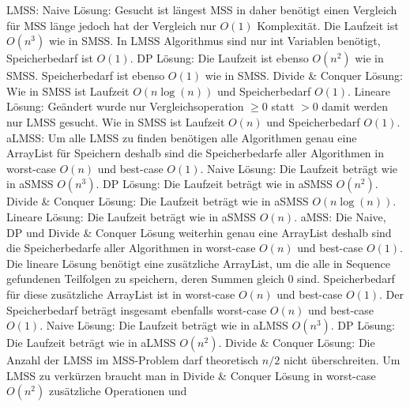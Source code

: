 \documentclass{article}
\begin{document}
\begin{flushleft}
\newline
LMSS:
\newline
Naive Lösung: Gesucht ist längest MSS in daher benötigt einen Vergleich für MSS länge 
jedoch hat der Vergleich nur $O(1)$ Komplexität. Die Laufzeit ist $O(n^3)$ wie in SMSS.
In LMSS Algorithmus sind nur int Variablen benötigt, Speicherbedarf ist $O(1)$.
\newline
DP Lösung: Die Laufzeit ist ebenso $O(n^2)$ wie in SMSS. Speicherbedarf ist ebenso $O(1)$ wie in SMSS.
\newline
Divide \& Conquer Lösung: Wie in SMSS ist Laufzeit $O(n\log(n))$ und Speicherbedarf $O(1)$.
\newline
Lineare Lösung: Geändert wurde nur Vergleichsoperation $\geq 0$ statt $>0$ damit werden nur LMSS gesucht. Wie in SMSS ist Laufzeit $O(n)$ und Speicherbedarf $O(1)$.
\newline
aLMSS:
\newline
Um alle LMSS zu finden benötigen alle Algorithmen genau eine ArrayList für Speichern deshalb sind die Speicherbedarfe 
aller Algorithmen in worst-case $O(n)$ und best-case $O(1)$.
\newline
Naive Lösung: Die Laufzeit beträgt wie in aSMSS $O(n^3)$. 
\newline
DP Lösung: Die Laufzeit beträgt wie in aSMSS $O(n^2)$.
\newline
Divide \& Conquer Lösung: Die Laufzeit beträgt wie in aSMSS $O(n\log(n))$.
\newline
Lineare Lösung: Die Laufzeit beträgt wie in aSMSS $O(n)$.
\newline
aMSS: Die Naive, DP und Divide \& Conquer Lösung weiterhin genau eine ArrayList deshalb sind die Speicherbedarfe 
aller Algorithmen in worst-case $O(n)$ und best-case $O(1)$. Die lineare Lösung benötigt eine zusätzliche ArrayList, 
um die alle in Sequence gefundenen Teilfolgen zu speichern, deren Summen gleich 0 sind. Speicherbedarf für diese zusätzliche 
ArrayList ist in worst-case $O(n)$ und best-case $O(1)$. Der Speicherbedarf beträgt insgesamt ebenfalls worst-case $O(n)$ und best-case $O(1)$. 
\newline
Naive Lösung: Die Laufzeit beträgt wie in aLMSS $O(n^3)$. 
\newline
DP Lösung: Die Laufzeit beträgt wie in aLMSS $O(n^2)$.
\newline
Divide \& Conquer Lösung: Die Anzahl der LMSS im MSS-Problem darf theoretisch $n/2$ nicht überschreiten.
Um LMSS zu verkürzen braucht man in Divide \& Conquer Lösung in worst-case $O(n^2)$ zusätzliche Operationen und 

\end{flushleft}
\end{document}
